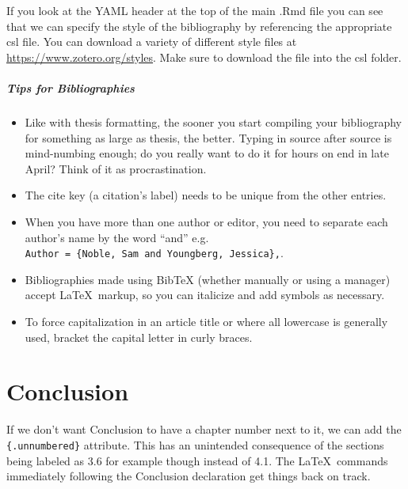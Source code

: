 \documentclass[12pt,twoside]{amherstthesis}
\providecommand{\tightlist}{%
  \setlength{\itemsep}{0pt}\setlength{\parskip}{0pt}}
\begin{document}
  If you look at the YAML header at the top of the main .Rmd file you can
  see that we can specify the style of the bibliography by referencing the
  appropriate csl file. You can download a variety of different style
  files at \url{https://www.zotero.org/styles}. Make sure to download the
  file into the csl folder.
  
  \paragraph{Tips for Bibliographies}\label{tips-for-bibliographies}
  
  \begin{itemize}
  \tightlist
  \item
    Like with thesis formatting, the sooner you start compiling your
    bibliography for something as large as thesis, the better. Typing in
    source after source is mind-numbing enough; do you really want to do
    it for hours on end in late April? Think of it as procrastination.
  \item
    The cite key (a citation's label) needs to be unique from the other
    entries.
  \item
    When you have more than one author or editor, you need to separate
    each author's name by the word ``and'' e.g.
    \texttt{Author\ =\ \{Noble,\ Sam\ and\ Youngberg,\ Jessica\},}.
  \item
    Bibliographies made using BibTeX (whether manually or using a manager)
    accept \LaTeX~markup, so you can italicize and add symbols as
    necessary.
  \item
    To force capitalization in an article title or where all lowercase is
    generally used, bracket the capital letter in curly braces.
  \end{itemize}
  
  \chapter*{Conclusion}\label{conclusion}
  
  \setcounter{chapter}{4} \setcounter{section}{0}
  
  If we don't want Conclusion to have a chapter number next to it, we can
  add the \texttt{\{.unnumbered\}} attribute. This has an unintended
  consequence of the sections being labeled as 3.6 for example though
  instead of 4.1. The \LaTeX~commands immediately following the Conclusion
  declaration get things back on track.
  
\end{document}
